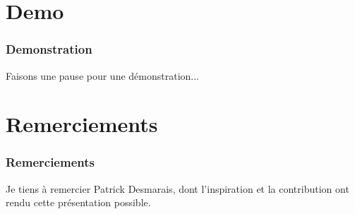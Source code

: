 \documentclass[aspectratio=169]{beamer}%
\begin{document}
\section{Demo}
\begin{frame}
\transwipe 
\frametitle{Demonstration}
\centering
Faisons une pause pour une démonstration...
\end{frame}


\section{Remerciements}
\begin{frame}
\transwipe 
\frametitle{Remerciements}
Je tiens à remercier Patrick Desmarais, dont l'inspiration et la contribution ont rendu cette présentation possible.

\end{frame}
\end{document}
